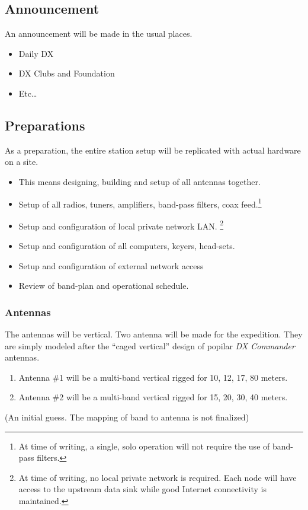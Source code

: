 \documentclass[11pt]{article}
\begin{document}
\subsection{Announcement}

An announcement will be made in the usual places.

\begin{itemize}
\item Daily DX
\item DX Clubs and Foundation
\item Etc\ldots
\end{itemize}

\subsection{Preparations}

As a preparation, the entire station setup will be replicated with actual
hardware on a site.

\begin{itemize}
\item This means designing, building and setup of all antennas together.
\item Setup of all radios, tuners, amplifiers, band-pass filters,
coax feed.\footnote{At time of writing, a single, solo
operation will not require the use of band-pass filters.}
\item Setup and configuration of local private network LAN.
\footnote{At time of writing, no local private network is required. Each
node will have access to the upstream data sink while good Internet
connectivity is maintained.}
\item Setup and configuration of all computers, keyers, head-sets.
\item Setup and configuration of external network access
\item Review of band-plan and operational schedule.
\end{itemize}

\subsubsection{Antennas}

The antennas will be vertical.   Two antenna will be made for
the expedition.  They are simply modeled after the ``caged vertical''
design of popilar {\textit{DX Commander}} antennas.
\par
\begin{enumerate}
\item Antenna \#1 will be a multi-band vertical rigged for 10, 12, 17, 80
meters.
\item Antenna \#2 will be a multi-band vertical rigged for 15, 20, 30, 40
meters.
\end{enumerate}
\par
(An initial guess. The mapping of band to antenna is not finalized)
\par
\end{document}
